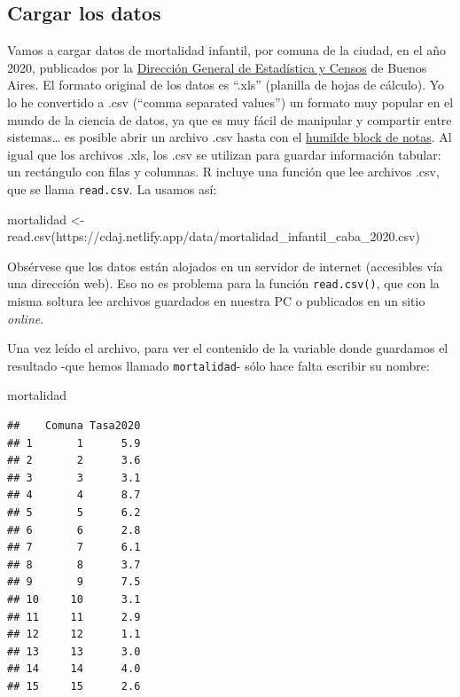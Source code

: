 \documentclass[
]{book}
\newenvironment{Shaded}{\begin{snugshade}}{\end{snugshade}}
\newcommand{\FunctionTok}[1]{\textcolor[rgb]{0.00,0.00,0.00}{#1}}
\newcommand{\NormalTok}[1]{#1}
\newcommand{\OtherTok}[1]{\textcolor[rgb]{0.56,0.35,0.01}{#1}}
\newcommand{\StringTok}[1]{\textcolor[rgb]{0.31,0.60,0.02}{#1}}
\begin{document}
\hypertarget{cargar-los-datos}{%
\subsection{Cargar los datos}\label{cargar-los-datos}}

Vamos a cargar datos de mortalidad infantil, por comuna de la ciudad, en el año 2020, publicados por la \href{https://www.estadisticaciudad.gob.ar/eyc/}{Dirección General de Estadística y Censos} de Buenos Aires. El formato original de los datos es ``.xls'' (planilla de hojas de cálculo). Yo lo he convertido a .csv (``comma separated values'') un formato muy popular en el mundo de la ciencia de datos, ya que es muy fácil de manipular y compartir entre sistemas\ldots{} es posible abrir un archivo .csv hasta con el \href{https://es.wikipedia.org/wiki/Bloc_de_notas}{humilde block de notas}. Al igual que los archivos .xls, los .csv se utilizan para guardar información tabular: un rectángulo con filas y columnas. R incluye una función que lee archivos .csv, que se llama \texttt{read.csv}. La usamos así:

\begin{Shaded}
\begin{Highlighting}[]
\NormalTok{mortalidad }\OtherTok{\textless{}{-}} \FunctionTok{read.csv}\NormalTok{(}\StringTok{\textquotesingle{}https://cdaj.netlify.app/data/mortalidad\_infantil\_caba\_2020.csv\textquotesingle{}}\NormalTok{)}
\end{Highlighting}
\end{Shaded}

Obsérvese que los datos están alojados en un servidor de internet (accesibles vía una dirección web). Eso no es problema para la función \texttt{read.csv()}, que con la misma soltura lee archivos guardados en nuestra PC o publicados en un sitio \emph{online}.

Una vez leído el archivo, para ver el contenido de la variable donde guardamos el resultado -que hemos llamado \texttt{mortalidad}- sólo hace falta escribir su nombre:

\begin{Shaded}
\begin{Highlighting}[]
\NormalTok{mortalidad}
\end{Highlighting}
\end{Shaded}

\begin{verbatim}
##    Comuna Tasa2020
## 1       1      5.9
## 2       2      3.6
## 3       3      3.1
## 4       4      8.7
## 5       5      6.2
## 6       6      2.8
## 7       7      6.1
## 8       8      3.7
## 9       9      7.5
## 10     10      3.1
## 11     11      2.9
## 12     12      1.1
## 13     13      3.0
## 14     14      4.0
## 15     15      2.6
\end{verbatim}
\end{document}
